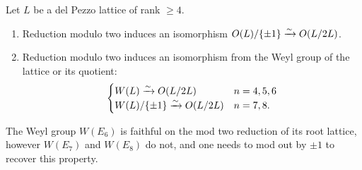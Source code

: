 \documentclass[11pt]{amsart}
\begin{document}
\begin{proposition} Let $L$ be a del Pezzo lattice of rank $\ge 4$.
\begin{enumerate}
    \item Reduction modulo two induces an isomorphism $O(L)/\{\pm 1\} \xrightarrow{\sim} O(L/2L)$.
    \item Reduction modulo two induces an isomorphism from the Weyl group of the lattice or its quotient:
    \begin{align*}
        \begin{cases} W(L) \xrightarrow{\sim} O(L/2L) & n=4,5,6 \\ W(L)/\{\pm1\}\xrightarrow{\sim} O(L/2L) & n=7,8. \end{cases}
    \end{align*}
\end{enumerate}
\end{proposition}


\begin{corollary} The Weyl group $W(E_6)$ is faithful on the mod two reduction of its root lattice, however $W(E_7)$ and $W(E_8)$ do not, and one needs to mod out by $\pm 1$ to recover this property.
\end{corollary}










\end{document}
